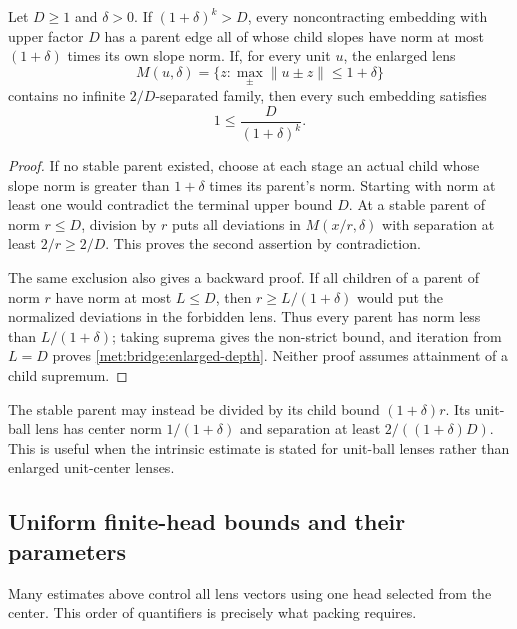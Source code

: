 \begin{proposition}
\label{met:stable-parent}\label{met:bridge:enlarged-backward}
Let $D\ge1$ and $\delta>0$. If $(1+\delta)^k>D$, every
noncontracting embedding with upper factor $D$ has a parent edge all of whose
child slopes have norm at most $(1+\delta)$ times its own slope norm.
If, for every unit $u$, the enlarged lens
\[
 M(u,\delta)=\{z:\max_\pm\|u\pm z\|\le1+\delta\}
\]
contains no infinite $2/D$-separated family, then every such embedding
satisfies
\begin{equation}\label{met:bridge:enlarged-depth}
 1\le \frac{D}{(1+\delta)^k}.
\end{equation}
\end{proposition}
\begin{proof}
If no stable parent existed, choose at each stage an actual child whose
slope norm is greater than $1+\delta$ times its parent's norm. Starting
with norm at least one would contradict the terminal upper bound $D$.
At a stable parent of norm $r\le D$, division by $r$ puts all deviations
in $M(x/r,\delta)$ with separation at least $2/r\ge2/D$.
This proves the second assertion by contradiction.

The same exclusion also gives a backward proof. If all children of a
parent of norm $r$ have norm at most $L\le D$, then
$r\ge L/(1+\delta)$ would put the normalized deviations in the forbidden
lens. Thus every parent has norm less than $L/(1+\delta)$; taking
suprema gives the non-strict bound, and iteration from $L=D$ proves
\eqref{met:bridge:enlarged-depth}. Neither proof assumes attainment of a
child supremum.
\end{proof}

The stable parent may instead be divided by its child bound
$(1+\delta)r$. Its unit-ball lens has center norm $1/(1+\delta)$
and separation at least $2/((1+\delta)D)$. This is useful when the
intrinsic estimate is stated for unit-ball lenses rather than enlarged
unit-center lenses.

\subsection{Uniform finite-head bounds and their parameters}\label{met:packing-section}
Many estimates above control all lens vectors using one head selected
from the center. This order of quantifiers is precisely what packing
requires.

